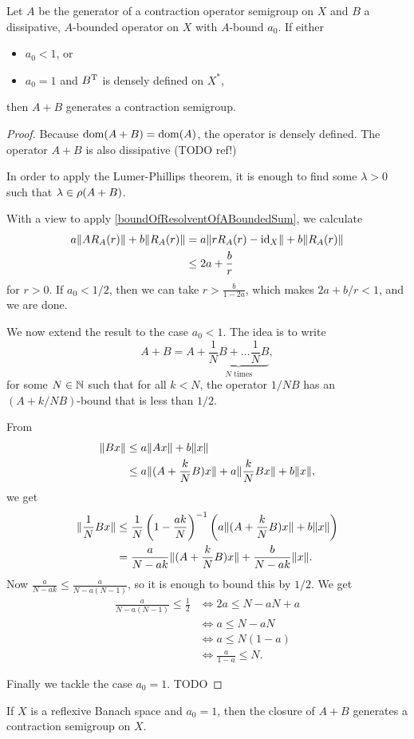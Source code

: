 \begin{proposition}
Let $A$ be the generator of a contraction operator semigroup on $X$ and $B$ a dissipative, $A$-bounded operator on $X$ with $A$-bound $a_0$. If either
\begin{itemize}
\item $a_0 < 1$, or
\item $a_0 = 1$ and $B^{\mathrm{T}}$ is densely defined on $X^*$,
\end{itemize}
then $A+B$ generates a contraction semigroup.
\end{proposition}
\begin{proof}
Because $\operatorname{dom}(A+B) = \operatorname{dom}(A)$, the operator is densely defined. The operator $A+B$ is also dissipative (TODO ref!)

In order to apply the Lumer-Phillips theorem, it is enough to find some $\lambda > 0$ such that $\lambda\in\rho(A+B)$.

With a view to apply \ref{boundOfResolventOfABoundedSum}, we calculate
\begin{align*}
a\lVert AR_A(r)\rVert + b\lVert R_A(r)\rVert &= a\lVert r R_A(r)-\operatorname{id}_X\rVert + b\lVert R_A(r)\rVert \\
&\leq 2a + \frac{b}{r}
\end{align*}
for $r > 0$. If $a_0 < 1/2$, then we can take $r > \frac{b}{1-2a}$, which makes $2a + b/r < 1$, and we are done.

We now extend the result to the case $a_0 < 1$. The idea is to write
\[ A+ B = A + \underbrace{\frac{1}{N}B + \ldots \frac{1}{N}B}_{\text{$N$ times}}, \]
for some $N\in \mathbb{N}$ such that for all $k < N$, the operator $1/N B$ has an $(A + k/N B)$-bound that is less than $1/2$.

From
\begin{align*}
\lVert Bx\rVert &\leq a\lVert Ax\rVert + b\lVert x\rVert \\
&\leq a\lVert(A+\frac{k}{N}B)x\rVert + a\lVert\frac{k}{N}Bx\rVert + b\lVert x\rVert,
\end{align*}
we get
\begin{align*}
\lVert\frac{1}{N}Bx\rVert &\leq \frac{1}{N}\left(1 - \frac{ak}{N}\right)^{-1}\left(a\lVert(A+\frac{k}{N}B)x\rVert + b\lVert x\rVert\right) \\
&= \frac{a}{N-ak}\lVert(A+\frac{k}{N}B)x\rVert + \frac{b}{N-ak}\lVert x\rVert.
\end{align*}
Now $\frac{a}{N-ak} \leq \frac{a}{N-a(N-1)}$, so it is enough to bound this by $1/2$. We get
\begin{align*}
\frac{a}{N-a(N-1)} \leq \frac{1}{2} &\iff 2a \leq N-aN +a \\
&\iff a \leq N-aN \\
&\iff a \leq N(1-a) \\
&\iff \frac{a}{1-a} \leq N.
\end{align*}

Finally we tackle the case $a_0 = 1$. TODO
\end{proof}
\begin{corollary}
If $X$ is a reflexive Banach space and $a_0 = 1$, then the closure of $A+B$ generates a contraction semigroup on $X$.
\end{corollary}

